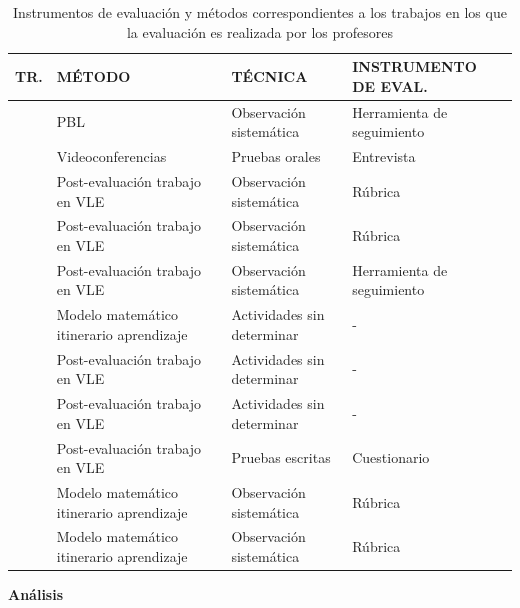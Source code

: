 \begin{table}
  \begin{center}
  \begin{tabular}{| c | m{5.5cm} | m{4.5cm} | m{3cm} |}
    \hline
    TR. & MÉTODO & TÉCNICA & INSTRUMENTO DE EVAL. \\
    \hline
    \hline
    \cite{lacuesta2009active}  & PBL & Observación sistemática & Herramienta de seguimiento \\
    \hline
    \cite{ward2011developing} & Videoconferencias & Pruebas orales & Entrevista  \\
    \hline
    \cite{martin2013acquired} & Post-evaluación trabajo en VLE & Observación sistemática  & Rúbrica \\
    \hline
    \cite{rodriguez2010portfolio} & Post-evaluación trabajo en VLE & Observación sistemática & Rúbrica  \\
    \hline
    \cite{benlloch2007adapting} & Post-evaluación trabajo en VLE & Observación sistemática & Herramienta de seguimiento \\
    \hline
    \cite{yang2014fine}  & Modelo matemático itinerario aprendizaje & Actividades sin determinar & -  \\
    \hline
    \cite{serrano2013hiperion} & Post-evaluación trabajo en VLE & Actividades sin determinar & -  \\
    \hline
    \cite{starcic2008sustaining} & Post-evaluación trabajo en VLE & Actividades sin determinar & - \\
    \hline
    \cite{vizcarro2013assessment}   & Post-evaluación trabajo en VLE & Pruebas escritas & Cuestionario \\
    \hline
    \cite{rashid2008engineering} & Modelo matemático itinerario aprendizaje & Observación sistemática & Rúbrica \\
    \hline
    \cite{aziz2007appraisal} & Modelo matemático itinerario aprendizaje & Observación sistemática & Rúbrica \\
    \hline
    \end{tabular}
\end{center}
\caption{Instrumentos de evaluación y métodos correspondientes a los trabajos en los que la evaluación es realizada por los profesores}
\label{tab:MetodosProfesor}
\end{table} 

\bigskip
\textbf{Análisis}
\bigskip


